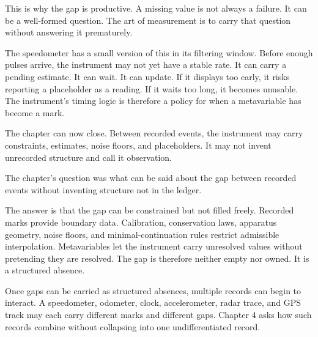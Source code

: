 This is why the gap is productive. A missing value is not always a failure. It
can be a well-formed question. The art of measurement is to carry that question
without answering it prematurely.

The speedometer has a small version of this in its filtering window. Before
enough pulses arrive, the instrument may not yet have a stable rate. It can
carry a pending estimate. It can wait. It can update. If it displays too early,
it risks reporting a placeholder as a reading. If it waits too long, it becomes
unusable. The instrument's timing logic is therefore a policy for when a
metavariable has become a mark.

The chapter can now close. Between recorded events, the instrument may carry
constraints, estimates, noise floors, and placeholders. It may not invent
unrecorded structure and call it observation.

\begin{bridge}

The chapter's question was what can be said about the gap between recorded
events without inventing structure not in the ledger.

The answer is that the gap can be constrained but not filled freely. Recorded
marks provide boundary data. Calibration, conservation laws, apparatus geometry,
noise floors, and minimal-continuation rules restrict admissible interpolation.
Metavariables let the instrument carry unresolved values without pretending they
are resolved. The gap is therefore neither empty nor owned. It is a structured
absence.

Once gaps can be carried as structured absences, multiple records can begin to
interact. A speedometer, odometer, clock, accelerometer, radar trace, and GPS
track may each carry different marks and different gaps. Chapter 4 asks how
such records combine without collapsing into one undifferentiated record.

\end{bridge}

